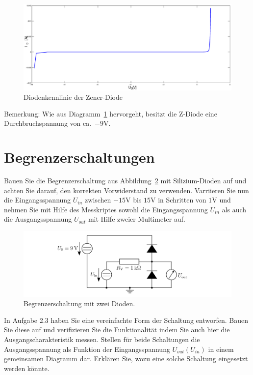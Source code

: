 \documentclass[10pt]{scrreprt}
\begin{document}
    \begin{figure}[H]
        \includegraphics[width=\textwidth]{SVG/ZGes}
        \caption{Diodenkennlinie der Zener-Diode}
        \label{fig:ZDiode}
    \end{figure}

    Bemerkung: Wie aus Diagramm~\ref{fig:ZDiode} hervorgeht, besitzt die Z-Diode
    eine Durchbruchspannung von ca.~$-9\si{\volt}$.

    \section{Begrenzerschaltungen}
    Bauen Sie die Begrenzerschaltung aus Abbildung~\ref{fig:abb14} mit Silizium-Dioden auf und achten
    Sie darauf, den korrekten Vorwiderstand zu verwenden. Varriieren Sie nun die Eingangsspannung
    $U_{in}$ zwischen $-15\si{\volt}$ bis $15\si{\volt}$ in Schritten von $1\si{\volt}$ und nehmen Sie mit Hilfe des
    Messkriptes sowohl die Eingangsspannung $U_{in}$ als auch die Ausgangsspannung $U_{out}$ mit
    Hilfe zweier Multimeter auf.
    \begin{figure}[H]
        \centering
        \includegraphics[width=\textwidth]{abb14.png}
        \caption{Begrenzerschaltung mit zwei Dioden.}
        \label{fig:abb14}
    \end{figure}
    In Aufgabe 2.3 haben Sie eine vereinfachte Form der Schaltung entworfen. Bauen Sie
    diese auf und verifizieren Sie die Funktionalität indem Sie auch hier die
    Ausgangscharakteristik messen. Stellen für beide Schaltungen die Ausgangsspannung als
    Funktion der Eingangsspannung $U_{out} (U_{in})$ in einem gemeinsamen Diagramm dar.
    Erklären Sie, wozu eine solche Schaltung eingesetzt werden könnte.
\end{document}
